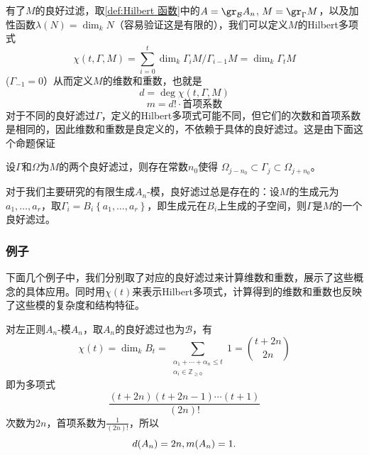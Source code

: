 \begin{example}
有了$M$的良好过滤，取\ref{def:Hilbert 函数}中的$A=\gr_{\mathcal{B}}A_n$, $M=\gr_\Gamma M$，以及加性函数$\lambda(N)=\dim_k N$（容易验证这是有限的），我们可以定义$M$的Hilbert多项式
\begin{equation*}
    \chi(t,\Gamma,M)=\sum_{i=0}^t \dim_k \Gamma_i M/\Gamma_{i-1} M
    =
    \dim_k \Gamma_t M
\end{equation*}
($\Gamma_{-1}=0$）从而定义$M$的维数和重数，也就是
\begin{equation*}
    d=\deg \chi(t,\Gamma,M)
\end{equation*}
\begin{equation*}
    m=d!\cdot \text{首项系数}
\end{equation*}
对于不同的良好滤过$\Gamma$，定义的Hilbert多项式可能不同，但它们的次数和首项系数是相同的，因此维数和重数是良定义的，不依赖于具体的良好滤过。这是由下面这个命题保证
\begin{proposition}
    设$\Gamma$和$\Omega$为$M$的两个良好滤过，则存在常数$n_0$使得
    $\Omega_{j-n_0}\subset\Gamma_j\subset \Omega_{j+n_0}$。
\end{proposition}
对于我们主要研究的有限生成$A_n$-模，良好滤过总是存在的：设$M$的生成元为$a_1,\dots,a_r$，取$\Gamma_i=B_i\left\{a_1,\ldots,a_r\right\}$，即生成元在$B_i$上生成的子空间，则$\Gamma$是$M$的一个良好滤过。


\subsubsection{例子}
下面几个例子中，我们分别取了对应的良好滤过来计算维数和重数，展示了这些概念的具体应用。同时用$\chi(t)$来表示Hilbert多项式，计算得到的维数和重数也反映了这些模的复杂度和结构特征。
\begin{example}
    对左正则$A_n$-模$A_n$，取$A_n$的良好滤过也为$\mathcal{B}$，有
    \begin{equation*}
        \chi(t) =\dim_k B_t
        =
        \sum_{\substack{\alpha_1+\cdots+\alpha_n\leq t \\ \alpha_i \in \mathbb{Z}_{\geq 0}}} 1
        =
        \binom{t+2n}{2n}
    \end{equation*}
    即为多项式
    \begin{equation*}
        \frac{(t+2n)(t+2n-1)\cdots(t+1)}{(2n)!}
    \end{equation*}
    次数为$2n$，首项系数为$\frac{1}{(2n)!}$，所以
    \begin{equation*}
        d(A_n)=2n,
        \\
        m(A_n)=1.
    \end{equation*}
\end{example}


\end{example}
